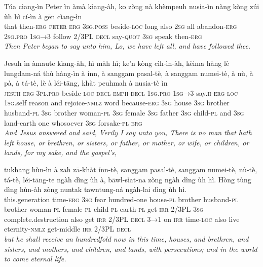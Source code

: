 \documentclass[11pt,a4paper]{article}
\begin{document}
\begin{exe}
\gll Túa cìang-ìn Peter ìn àmà kìang-àh, ko zòng nà khèmpeuh nusia-ìn nàng kòng zúi ùh hì cí-ìn à gēn cìang-ìn \\
     that then-\textsc{erg} \textsc{peter} \textsc{erg} \textsc{3sg}.\textsc{poss} beside-\textsc{loc} long also \textsc{2sg} all abandon-\textsc{erg} \textsc{2sg}.\textsc{pro} \textsc{1sg→3} follow 2/3PL \textsc{decl} say-\textsc{quot} \textsc{3sg} speak then-\textsc{erg} \\
\glt \textcolor{kjvcolor}{\textit{Then Peter began to say unto him, Lo, we have left all, and have followed thee.}}

\gll Jesuh ìn àmaute kìang-àh, hì màh hì; ke'n kòng cìh-ìn-àh, kèima hàng lè lungdam-ná thù hàng-ìn à ínn, à sanggam pasal-tè, à sanggam numei-tè, à nù, à pà, à tá-tè, lè à léi-tāng, khàt peuhmah à nusia-tè ìn \\
     \textsc{jesuh} \textsc{erg} \textsc{3pl}.\textsc{pro} beside-\textsc{loc} \textsc{decl} \textsc{emph} \textsc{decl} \textsc{1sg}.\textsc{pro} \textsc{1sg→3} say.\textsc{ii}-\textsc{erg}-\textsc{loc} \textsc{1sg}.self reason and rejoice-\textsc{nmlz} word because-\textsc{erg} \textsc{3sg} house \textsc{3sg} brother husband-\textsc{pl} \textsc{3sg} brother woman-\textsc{pl} \textsc{3sg} female \textsc{3sg} father \textsc{3sg} child-\textsc{pl} and \textsc{3sg} land-earth one whosoever \textsc{3sg} forsake-\textsc{pl} \textsc{erg} \\
\glt \textcolor{kjvcolor}{\textit{And Jesus answered and said, Verily I say unto you, There is no man that hath left house, or brethren, or sisters, or father, or mother, or wife, or children, or lands, for my sake, and the gospel's,}}

\gll tukhang hùn-ìn à zah zā-khàt ínn-tè, sanggam pasal-tè, sanggam numei-tè, nù-tè, tá-tè, léi-tāng-te ngàh dìng ùh à, bāwl-sìat-na zòng ngàh dìng ùh hì. Hòng tùng dìng hùn-àh zòng nuntak tawntung-ná ngàh-lai dìng ùh hì. \\
     this.generation time-\textsc{erg} \textsc{3sg} fear hundred-one house-\textsc{pl} brother husband-\textsc{pl} brother woman-\textsc{pl} female-\textsc{pl} child-\textsc{pl} earth-\textsc{pl} get \textsc{irr} 2/3PL \textsc{3sg} complete.destruction also get \textsc{irr} 2/3PL \textsc{decl} \textsc{3→1} on \textsc{irr} time-\textsc{loc} also live eternity-\textsc{nmlz} get-middle \textsc{irr} 2/3PL \textsc{decl} \\
\glt \textcolor{kjvcolor}{\textit{but he shall receive an hundredfold now in this time, houses, and brethren, and sisters, and mothers, and children, and lands, with persecutions; and in the world to come eternal life.}}


\end{exe}
\end{document}
